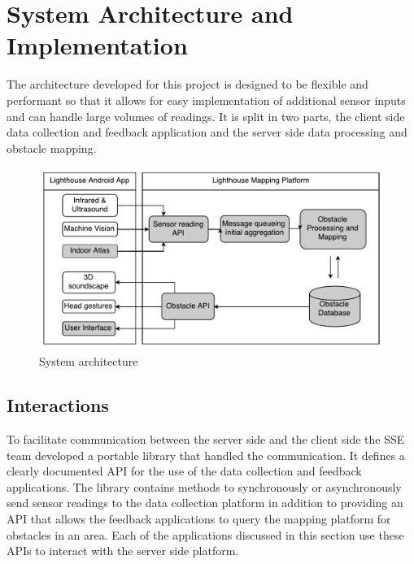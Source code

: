 \documentclass[prodmode,acmtosem]{acmsmall} %
\begin{document}
\section{System Architecture and Implementation}
\label{sec:architecture}
The architecture developed for this project is designed to be flexible and performant so that it allows for easy implementation of additional sensor inputs and can handle large volumes of readings. It is split in two parts, the client side data collection and feedback application and the server side data processing and obstacle mapping.

\begin{figure}[!ht]
\label{fig:architecture}
\centering
\includegraphics[width=\textwidth]{ReportDiagram.pdf}
\caption{System architecture}
\end{figure}

\subsection{Interactions}
\label{sec:interactions}
To facilitate communication between the server side and the client side the SSE team developed a portable library that handled the communication. It defines a clearly documented API for the use of the data collection and feedback applications. The library contains methods to synchronously or asynchronously send sensor readings to the data collection platform in addition to providing an API that allows the feedback applications to query the mapping platform for obstacles in an area. Each of the applications discussed in this section use these APIs to interact with the server side platform.
\end{document}
